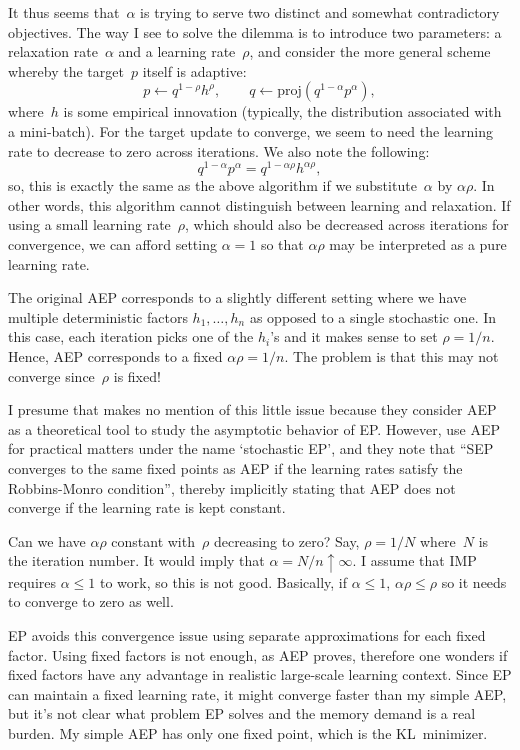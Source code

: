 \documentclass{article}
\begin{document}
It thus seems that~$\alpha$ is trying to serve two distinct and somewhat contradictory objectives. The way I see to solve the dilemma is to introduce two parameters: a relaxation rate~$\alpha$ and a learning rate~$\rho$, and consider the more general scheme whereby the target~$p$ itself is adaptive:
$$
p \leftarrow q^{1-\rho} h^\rho,
\qquad
q \leftarrow \text{proj}(q^{1-\alpha}p^\alpha),
$$
where~$h$ is some empirical innovation (typically, the distribution associated with a mini-batch). For the target update to converge, we seem to need the learning rate to decrease to zero across iterations. We also note the following:
$$
q^{1-\alpha}p^\alpha = q^{1-\alpha\rho}h^{\alpha\rho},
$$
so, this is exactly the same as the above algorithm if we substitute~$\alpha$ by $\alpha\rho$. In other words, this algorithm cannot distinguish between learning and relaxation. If using a small learning rate~$\rho$, which should also be decreased across iterations for convergence, we can afford setting $\alpha=1$ so that $\alpha\rho$ may be interpreted as a pure learning rate.

The original AEP corresponds to a slightly different setting where we have multiple deterministic factors $h_1,\ldots,h_n$ as opposed to a single stochastic one. In this case, each iteration picks one of the $h_i$'s and it makes sense to set $\rho=1/n$.  Hence, AEP corresponds to a fixed $\alpha\rho=1/n$. The problem is that this may not converge since~$\rho$ is fixed!

I presume that \cite{Dehaene-18} makes no mention of this little issue because they consider AEP as a theoretical tool to study the asymptotic behavior of EP. However, \cite{Li-15} use AEP for practical matters under the name `stochastic EP', and they note that ``SEP converges to the same fixed points as AEP if the learning rates satisfy the Robbins-Monro condition'', thereby implicitly stating that AEP does not converge if the learning rate is kept constant.

Can we have $\alpha\rho$ constant with~$\rho$ decreasing to zero? Say, $\rho=1/N$ where~$N$ is the iteration number. It would imply that $\alpha = N/n \uparrow \infty$. I assume that IMP requires $\alpha \leq 1$ to work, so this is not good. Basically, if $\alpha\leq 1$, $\alpha\rho\leq \rho$ so it needs to converge to zero as well.

EP avoids this convergence issue using separate approximations for each fixed factor. Using fixed factors is not enough, as AEP proves, therefore one wonders if fixed factors have any advantage in realistic large-scale learning context. Since EP can maintain a fixed learning rate, it might converge faster than my simple AEP, but it's not clear what problem EP solves and the memory demand is a real burden. My simple AEP has only one fixed point, which is the KL~minimizer. 
\end{document}
